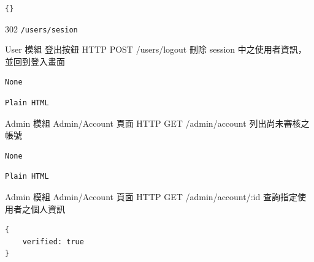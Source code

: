 \documentclass{article}
\begin{document}
\bigskip

\begin{lrbox}{\jsoninputbox}
	\begin{lstlisting}
{}
\end{lstlisting}
\end{lrbox}

\begin{lrbox}{\jsonoutputbox}
	302 \texttt{/users/sesion}
\end{lrbox}

{User 模組}
{登出按鈕}
{HTTP POST}
{/users/logout}
{刪除 session 中之使用者資訊，並回到登入畫面}

\bigskip

\begin{lrbox}{\jsoninputbox}
	\begin{lstlisting}
None
\end{lstlisting}
\end{lrbox}

\begin{lrbox}{\jsonoutputbox}
	\begin{lstlisting}
Plain HTML
\end{lstlisting}
\end{lrbox}

{Admin 模組}
{Admin/Account 頁面}
{HTTP GET}
{/admin/account}
{列出尚未審核之帳號}

\bigskip

\begin{lrbox}{\jsoninputbox}
	\begin{lstlisting}
None
\end{lstlisting}
\end{lrbox}

\begin{lrbox}{\jsonoutputbox}
	\begin{lstlisting}
Plain HTML
\end{lstlisting}
\end{lrbox}

{Admin 模組}
{Admin/Account 頁面}
{HTTP GET}
{/admin/account/:id}
{查詢指定使用者之個人資訊}

\bigskip

\begin{lrbox}{\jsoninputbox}
	\begin{lstlisting}
{
	verified: true
}
\end{lstlisting}
\end{lrbox}

\begin{lrbox}{\jsonoutputbox}
\end{lrbox}
\end{document}
